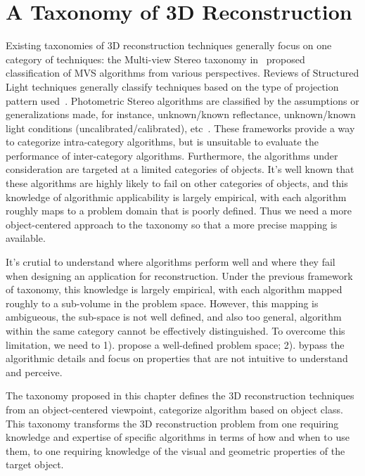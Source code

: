 
\chapter{A Taxonomy of 3D Reconstruction}
\label{ch:3DRecon_Taxo}
Existing taxonomies of 3D reconstruction techniques generally focus on one category of techniques: the Multi-view Stereo taxonomy in~\cite{seitz2006comparison} proposed classification of MVS algorithms from various perspectives. Reviews of Structured Light techniques generally classify techniques based on the type of projection pattern used~\cite{geng2011structured, salvi2004pattern}. Photometric Stereo algorithms are classified by the assumptions or generalizations made, for instance, unknown/known reflectance, unknown/known light conditions (uncalibrated/calibrated), etc~\cite{shi2016benchmark}. These frameworks provide a way to categorize intra-category algorithms, but is unsuitable to evaluate the performance of inter-category algorithms. Furthermore, the algorithms under consideration are targeted at a limited categories of objects. It's well known that these algorithms are highly likely to fail on other categories of objects, and this knowledge of algorithmic applicability is largely empirical, with each algorithm roughly maps to a problem domain that is poorly defined. Thus we need a more object-centered approach to the taxonomy so that a more precise mapping is available.

It's crutial to understand where algorithms perform well and where they fail when designing an application for reconstruction. Under the previous framework of taxonomy, this knowledge is largely empirical, with each algorithm mapped roughly to a sub-volume in the problem space. However, this mapping is ambigueous, \ie the sub-space is not well defined, and also too general, \ie algorithm within the same category cannot be effectively distinguished. To overcome this limitation, we need to 1). propose a well-defined problem space; 2). bypass the algorithmic details and focus on properties that are not intuitive to understand and perceive.

The taxonomy proposed in this chapter defines the 3D reconstruction techniques from an object-centered viewpoint, \ie categorize algorithm based on object class. This taxonomy transforms the 3D reconstruction problem from one requiring knowledge and expertise of specific algorithms in terms of how and when to use them, to one requiring knowledge of the visual and geometric properties of the target object.

